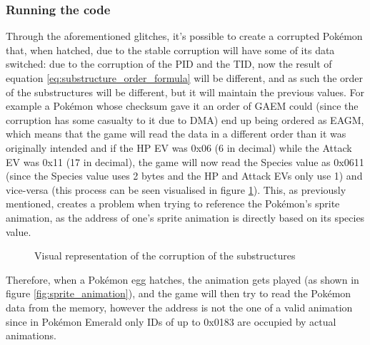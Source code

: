 \documentclass[a4paper]{usiinfbachelorproject}
\begin{document}
\subsubsection{Running the code}
\label{sec:running_the_code}
Through the aforementioned glitches, it's possible to create a corrupted Pokémon that, when hatched, due to the stable corruption will have some of its data switched: due to the corruption of the PID and the TID, now the result of equation \ref{eq:substructure_order_formula} will be different, and as such the order of the substructures will be different, but it will maintain the previous values. For example a Pokémon whose checksum gave it an order of GAEM could (since the corruption has some casualty to it due to DMA) end up being ordered as EAGM, which means that the game will read the data in a different order than it was originally intended and if the HP EV was 0x06 (6 in decimal) while the Attack EV was 0x11 (17 in decimal), the game will now read the Species value as 0x0611 (since the Species value uses 2 bytes and the HP and Attack EVs only use 1) and vice-versa (this process can be seen visualised in figure \ref{fig:corruption_substructures}). This, as previously mentioned, creates a problem when trying to reference the Pokémon's sprite animation, as the address of one's sprite animation is directly based on its species value.

\begin{figure}[h!]
	\caption{Visual representation of the corruption of the substructures}
	\label{fig:corruption_substructures}
\end{figure}

Therefore, when a Pokémon egg hatches, the animation gets played (as shown in figure \ref{fig:sprite_animation}), and the game will then try to read the Pokémon data from the memory, however the address is not the one of a valid animation since in Pokémon Emerald only IDs of up to 0x0183 are occupied by actual animations.
\end{document}
